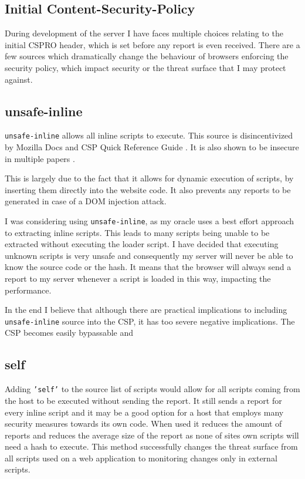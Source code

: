 \begin{description}
\begin{description}
\section{Initial Content-Security-Policy}

During development of the server I have faces multiple choices relating to the initial CSPRO header, which is set before any report is even received.
There are a few sources which dramatically change the behaviour of browsers enforcing the security policy, which impact security or the threat surface that I may protect against.

\subsection{unsafe-inline}

\texttt{unsafe-inline} allows all inline scripts to execute. 
This source is disincentivized by Mozilla Docs \cite{unsafeinlinebad2} and CSP Quick Reference Guide \cite{unsafeinlinebad1}.
It is also shown to be insecure in multiple papers \cite{weichselbaum2016csp} \cite{osti_10173479}.

This is largely due to the fact that it allows for dynamic execution of scripts, by inserting them directly into the website code.
It also prevents any reports to be generated in case of a DOM injection attack.

I was considering using \texttt{unsafe-inline}, as my oracle uses a best effort approach to extracting inline scripts.
This leads to many scripts being unable to be extracted without executing the loader script.
I have decided that executing unknown scripts is very unsafe and consequently my server will never be able to know the source code or the hash.
It means that the browser will always send a report to my server whenever a script is loaded in this way, impacting the performance.

In the end I believe that although there are practical implications to including \texttt{unsafe-inline} source into the CSP, it has too severe negative implications.
The CSP becomes easily bypassable and 

\subsection{self}

Adding \texttt{'self'} to the source list of scripts would allow for all scripts coming from the host to be executed without sending the report.
It still sends a report for every inline script and it  may be a good option for a host that employs many security measures towards its own code.
When used it reduces the amount of reports and reduces the average size of the report as none of sites own scripts will need a hash to execute.
This method successfully changes the threat surface from all scripts used on a web application to monitoring changes only in external scripts.


\end{description}
\end{description}
